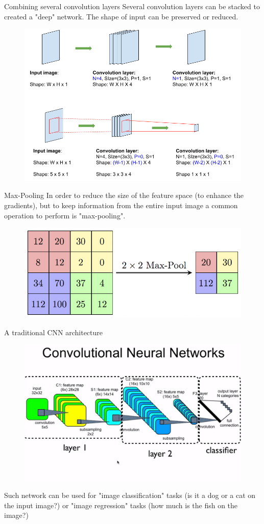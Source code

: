 \documentclass[handout]{beamer}
\begin{document}
\begin{frame}{Combining several convolution layers}
    Several convolution layers can be stacked to created a "deep" network. The shape of input can be preserved or reduced.
    \begin{figure}
   \centering
    \includegraphics[width=.7\textwidth]{fig/L2/only_convolutional_layers_options.png}
\end{figure}
\end{frame}

\begin{frame}{Max-Pooling}
    In order to reduce the size of the feature space (to enhance the gradients), but to keep information from the entire input image a common operation to perform is "max-pooling".
    \begin{figure}
   \centering
    \includegraphics[width=.6\textwidth]{fig/L2/MaxpoolSample2.png}
\end{figure}
\end{frame}

\begin{frame}[fragile]{A traditional CNN architecture}
    \begin{figure}
    \centering
    \includegraphics[width=.8\textwidth,trim={0 0cm 0cm 3cm},clip]{fig/L2/CNN.png}
    \end{figure}
Such network can be used for "image classification" tasks (is it a dog or a cat on the input image?) or "image regression" tasks (how much is the fish on the image?)
\end{frame}
\end{document}
